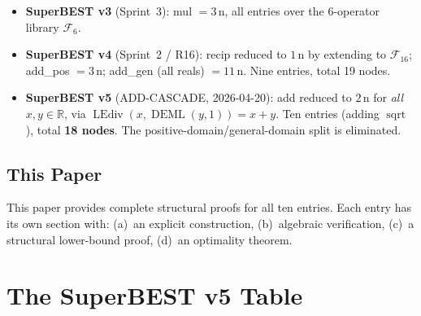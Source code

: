 \documentclass[12pt,a4paper]{article}
\theoremstyle{definition}
\newcommand{\DEML}{\operatorname{DEML}}
\newcommand{\LEdiv}{\operatorname{LEdiv}}
\newcommand{\sqrtop}{\operatorname{sqrt}}
\newcommand{\R}{\mathbb{R}}
\begin{document}
\begin{itemize}
  \item \textbf{SuperBEST v3} (Sprint~3): mul $= 3\,\text{n}$, all entries over the
    6-operator library $\mathcal{F}_6$.
  \item \textbf{SuperBEST v4} (Sprint~2 / R16): recip reduced to $1\,\text{n}$ by
    extending to $\mathcal{F}_{16}$; add\_pos $= 3\,\text{n}$; add\_gen (all reals) $= 11\,\text{n}$.
    Nine entries, total 19 nodes.
  \item \textbf{SuperBEST v5} (ADD-CASCADE, 2026-04-20): add reduced to
    $2\,\text{n}$ for \emph{all} $x, y \in \R$, via
    $\LEdiv(x, \DEML(y,1)) = x + y$.
    Ten entries (adding $\sqrtop$), total \textbf{18 nodes}.
    The positive-domain/general-domain split is eliminated.
\end{itemize}

\subsection{This Paper}

This paper provides complete structural proofs for all ten entries.
Each entry has its own section with:
(a)~an explicit construction, (b)~algebraic verification,
(c)~a structural lower-bound proof, (d)~an optimality theorem.

\section{The SuperBEST v5 Table}
\label{sec:table}
\end{document}
